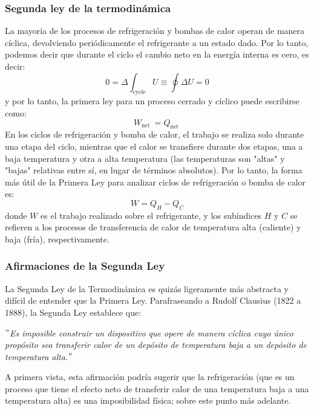 \subsubsection{Segunda ley de la termodinámica}
La mayoría de los procesos de refrigeración y bombas de calor operan de manera cíclica, devolviendo periódicamente el refrigerante a un estado dado. Por lo tanto, podemos decir que durante el ciclo el cambio neto en la energía interna es cero, es decir:
\begin{equation}
	0 = \Delta \int_{\text{cycle}} U \equiv \oint\Delta U = 0
\end{equation}
y por lo tanto, la primera ley para un proceso cerrado y cíclico puede escribirse como:
\begin{equation}
	W_\text{net }  = Q_\text{net } 
\end{equation}
En los ciclos de refrigeración y bomba de calor, el trabajo se realiza solo durante una etapa del ciclo, mientras que el calor se transfiere durante dos etapas, una a baja temperatura y otra a alta temperatura (las temperaturas son "altas" y "bajas" relativas entre sí, en lugar de términos absolutos). Por lo tanto, la forma más útil de la Primera Ley para analizar ciclos de refrigeración o bomba de calor es:
\begin{equation}
	   W =Q_H -Q_C
\end{equation}
donde $W$ es el trabajo realizado sobre el refrigerante, y los subíndices $H$ y $C$ se refieren a los procesos de transferencia de calor de temperatura alta (caliente) y baja (fría), respectivamente.


\subsubsection*{Afirmaciones de la Segunda Ley}

La Segunda Ley de la Termodinámica es quizás ligeramente más abstracta y difícil de entender que la Primera Ley. Parafraseando a Rudolf Clausius (1822 a 1888), la Segunda Ley establece que:
\begin{center}
		\textit{$"$Es imposible construir un dispositivo que opere de manera cíclica cuyo único propósito sea transferir calor de un depósito de temperatura baja a un depósito de temperatura alta.$"$}
\end{center}
A primera vista, esta afirmación podría sugerir que la refrigeración (que es un proceso que tiene el efecto neto de transferir calor de una temperatura baja a una temperatura alta) es una imposibilidad física; sobre este punto más adelante.

